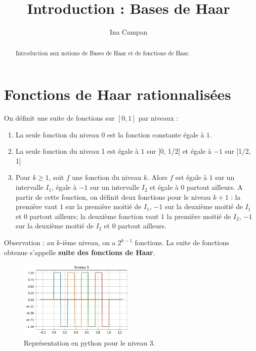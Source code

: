 \documentclass{article}
\title{Introduction : Bases de Haar}
\author{Ina Campan}
\begin{document}
\maketitle

\begin{abstract}

Introduction aux notions de Bases de Haar et de fonctions de Haar.

\end{abstract}

\section{Fonctions de Haar rationnalisées}

On définit une suite de fonctions sur $[0,1]$ par niveaux :

\begin{enumerate}

\item La seule fonction du niveau 0 est la fonction constante égale à $1$.
\item La seule fonction du niveau 1 est égale à $1$ sur [0, 1/2] et égale à $-1$ sur [1/2, 1]
\item Pour $k \geqslant 1$, soit $f$ une fonction du niveau $k$. Alors $f$ est égale à $1$ sur un intervalle $I_1$, égale à $-1$ sur un intervalle $I_2$ et égale à $0$ partout ailleurs. A partir de cette fonction, on définit deux fonctions pour le niveau $k+1$ : la première vaut $1$ sur la première moitié de $I_1$, $-1$ sur la deuxième moitié de $I_1$ et $0$ partout ailleurs; la deuxième fonction vaut $1$ la première moitié de $I_2$, $-1$ sur la deuxième moitié de $I_2$ et $0$ partout ailleurs.

\end{enumerate}

Observation : au $k$-ième niveau, on a $2^{k-1}$ fonctions. La suite de fonctions obtenue s'appelle \textbf{suite des fonctions de Haar}.

\begin{figure}[h]
\centering
\caption{Représentation en python pour le niveau 3.}
\includegraphics[width=0.5\textwidth]{Images/HaarExempleNiveau3.png}
\end{figure}
\end{document}
